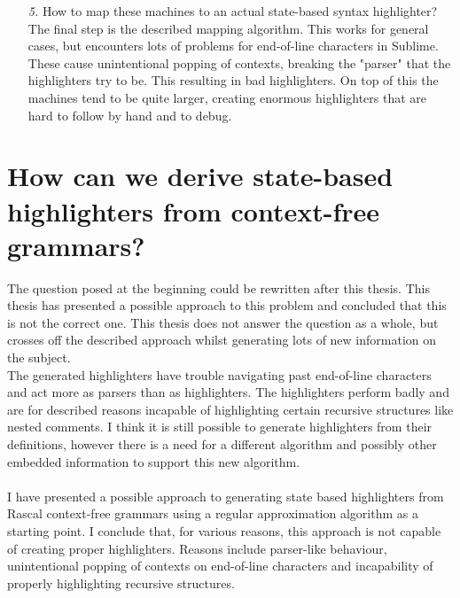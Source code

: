 \begin{enumerate}
\pagebreak	\item[\textit{5.}] How to map these machines to an actual state-based syntax highlighter?\\
	The final step is the described mapping algorithm. This works for general cases, but encounters lots of problems for end-of-line characters in Sublime. These cause unintentional popping of contexts, breaking the "parser" that the highlighters try to be. This resulting in bad highlighters. On top of this the machines tend to be quite larger, creating enormous highlighters that are hard to follow by hand and to debug.
\end{enumerate} 

\section{How can we derive state-based highlighters from context-free grammars?}
The question posed at the beginning could be rewritten after this thesis. This thesis has presented a possible approach to this problem and concluded that this is not the correct one. This thesis does not answer the question as a whole, but crosses off the described approach whilst generating lots of new information on the subject.\\
The generated highlighters have trouble navigating past end-of-line characters and act more as parsers than as highlighters. The highlighters perform badly and are for described reasons incapable of highlighting certain recursive structures like nested comments. I think it is still possible to generate highlighters from their definitions, however there is a need for a different algorithm and possibly other embedded information to support this new algorithm.\\\\
I have presented a possible approach to generating state based highlighters from Rascal context-free grammars using a regular approximation algorithm as a starting point. I conclude that, for various reasons, this approach is not capable of creating proper highlighters. Reasons include parser-like behaviour, unintentional popping of contexts on end-of-line characters and incapability of properly highlighting recursive structures. 
